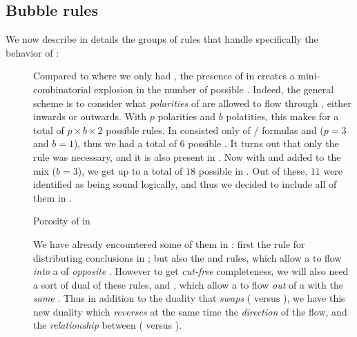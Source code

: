 \subsection{Bubble rules}

We now describe in details the groups of rules that handle specifically the
behavior of :

\begin{description}
  \item[\flow]

  Compared to  where we only had  , the presence of
    in  creates a mini-combinatorial
  explosion in the number of possible . Indeed, the general
  scheme is to consider what \emph{polarities} of  are allowed to flow
  through , either inwards or outwards. With $p$  polarities and
  $b$  polatities, this makes for a total of $p \times b \times 2$
  possible rules. In   consisted only of
  / formulas and   ($p = 3$
  and $b = 1$), thus we had a total of $6$ possible . It turns
  out that only the  rule was necessary, and it is also present in
  . Now with  and   added to
  the mix ($b = 3$), we get up to a total of $18$ possible  in
  . Out of these, $11$ were identified as being sound logically,
  and thus we decided to include all of them in .

  \begin{marginfigure}
    \hspace{-1.5em}
    \caption{Porosity of  in }
  \end{marginfigure}
  
  We have already encountered some of them in : first the
   rule for distributing conclusions in ; but also
  the  and  rules, which allow a
    to flow \emph{into} a  of \emph{opposite}
  . However to get \emph{cut-free} completeness, we will also need
  a sort of dual of these rules,  and , which
  allow a   to flow \emph{out} of a  with the
  \emph{same} . Thus in addition to the duality that \emph{swaps}
   ( versus ), we have this new
  duality which \emph{reverses} at the same time the \emph{direction} of the
  flow, and the \emph{relationship} between  (
  versus ).


\end{description}
